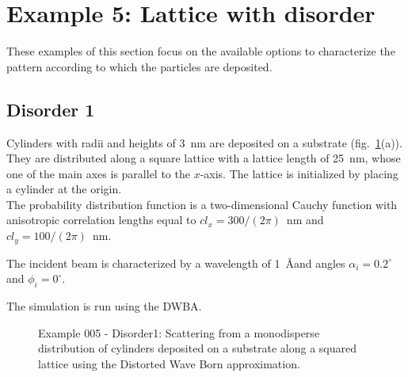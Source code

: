 \newpage
\section{Example 5: Lattice with disorder}
These examples of this section focus on the available options to characterize the pattern according to which the particles are deposited.

\subsection{Disorder 1} \label{sec:ex005Dis1}
Cylinders with radii and heights of 3~nm are deposited on a substrate (fig.~\ref{fig:PythonEx5Dis1}(a)). They are distributed along a square lattice with a lattice length of 25~nm, whose one of the main axes is parallel to the $x$-axis. The lattice is initialized by placing a cylinder at the origin.\\ The probability distribution function is a two-dimensional Cauchy function  with anisotropic correlation lengths equal to $cl_x=300/(2\pi)$~nm and $cl_y=100/(2\pi)$~nm.


The incident beam is characterized by a wavelength of 1~\AA and angles $\alpha_i=0.2^{\circ}$ and $\phi_i=0^{\circ}$.
 
The simulation is run using the DWBA.

\begin{figure}[H]
\hfill
{}
\hfill
{}
\hfill
\caption{Example 005 - Disorder1: Scattering from a monodisperse distribution of cylinders deposited on a substrate along a squared lattice using the Distorted Wave Born approximation.}
\label{fig:PythonEx5Dis1} 
\end{figure}


